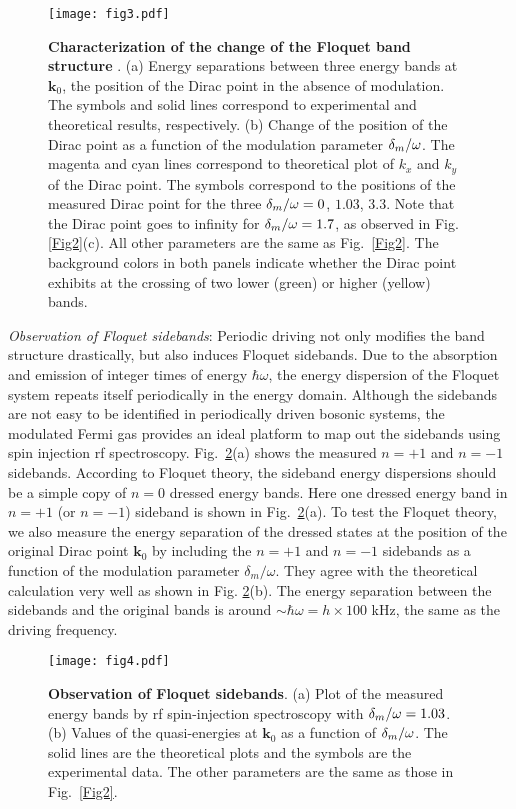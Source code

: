 \documentclass[aps,prl,twocolumn,floatfix,reprint]{revtex4}
\begin{document}
\begin{figure}[b]
\centerline{
\texttt{[image: fig3.pdf]}}
\caption{\textbf{Characterization of the change of the Floquet band structure%
}. (a) Energy separations between three energy bands at $\mathbf{k}_{0}$,
the position of the Dirac point in the absence of modulation. The symbols
and solid lines correspond to experimental and theoretical results,
respectively. (b) Change of the position of the Dirac point as a function of
the modulation parameter $\protect\delta _{m}/\protect\omega $. The magenta
and cyan lines correspond to theoretical plot of $k_{x}$ and $k_{y}$ of the
Dirac point. The symbols correspond to the positions of the measured Dirac
point for the three $\protect\delta _{m}/\protect\omega =0$, $1.03$, $3.3$.
Note that the Dirac point goes to infinity for $\protect\delta _{m}/\protect%
\omega =1.7$, as observed in Fig. \protect\ref{Fig2}(c). All other
parameters are the same as Fig.~\protect\ref{Fig2}. The background colors in
both panels indicate whether the Dirac point exhibits at the crossing of two
lower (green) or higher (yellow) bands.}
\label{Fig3}
\end{figure}

\emph{Observation of Floquet sidebands}: Periodic driving not only modifies
the band structure drastically, but also induces Floquet sidebands. Due to
the absorption and emission of integer times of energy $\hbar \omega $, the
energy dispersion of the Floquet system repeats itself periodically in the
energy domain. Although the sidebands are not easy to be identified in
periodically driven bosonic systems, the modulated Fermi gas provides an
ideal platform to map out the sidebands using spin injection rf
spectroscopy. Fig.~\ref{Fig4}(a) shows the measured $n=+1$ and $n=-1$
sidebands. According to Floquet theory, the sideband energy dispersions
should be a simple copy of $n=0$ dressed energy bands. Here one dressed
energy band in $n=+1$ (or $n=-1$) sideband is shown in Fig.~\ref{Fig4}(a).
To test the Floquet theory, we also measure the energy separation of the
dressed states at the position of the original Dirac point $\mathbf{k}_{0}$
by including the $n=+1$ and $n=-1$ sidebands as a function of the modulation
parameter $\delta _{m}/\omega $. They agree with the theoretical calculation
very well as shown in Fig. \ref{Fig4}(b). The energy separation between the
sidebands and the original bands is around $\sim \hbar \omega =h\times 100$
kHz, the same as the driving frequency.

\begin{figure}[tbp]
\centerline{
\texttt{[image: fig4.pdf]}} %
\caption{\textbf{Observation of Floquet sidebands}. (a) Plot of the measured
energy bands by rf spin-injection spectroscopy with $\protect\delta _{m}/%
\protect\omega =1.03$. (b) Values of the quasi-energies at $\mathbf{k}_{0}$
as a function of $\protect\delta _{m}/\protect\omega $. The solid lines are
the theoretical plots and the symbols are the experimental data. The other
parameters are the same as those in Fig.~\protect\ref{Fig2}. }
\label{Fig4}
\end{figure}
\end{document}
